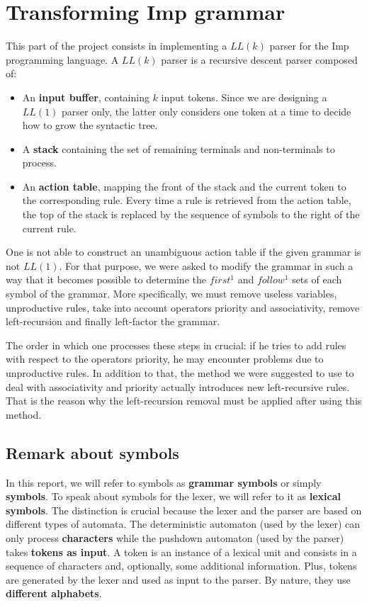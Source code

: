 \chapter{Transforming Imp grammar}

This part of the project consists in implementing a $LL(k)$ parser for the Imp programming language. A $LL(k)$ parser is a recursive descent parser composed of:

\begin{itemize}
\item An \textbf{input buffer}, containing $k$ input tokens. Since we are designing a $LL(1)$ parser only, the latter only considers one token at a time to decide how to grow the syntactic tree.
\item A \textbf{stack} containing the set of remaining terminals and non-terminals to process.
\item An \textbf{action table}, mapping the front of the stack and the current token to the corresponding rule. Every time a rule is retrieved from the action table, the top of the stack is replaced by the sequence of symbols to the right of the current rule.
\end{itemize}

One is not able to construct an unambiguous action table if the given grammar is not $LL(1)$. For that purpose, we were asked to modify the grammar in such a way
that it becomes possible to determine the $first^1$ and $follow^1$ sets of each symbol of the grammar. More specifically,
we must remove useless variables, unproductive rules, take into account operators priority and associativity, remove left-recursion and finally left-factor the grammar.

The order in which one processes these steps in crucial: if he tries to add rules with respect to the operators
priority, he may encounter problems due to unproductive rules. In addition to that, the method we were suggested to use
to deal with associativity and priority actually introduces new left-recursive rules. That is the reason why the
left-recursion removal must be applied after using this method.

\section{Remark about symbols}
In this report, we will refer to symbols as \textbf{grammar symbols} or simply \textbf{symbols}.
To speak about symbols for the lexer, we will refer to it as \textbf{lexical symbols}.
The distinction is crucial because the lexer and the parser are based on different types of automata.
The deterministic automaton (used by the lexer) can only process \textbf{characters} while the pushdown automaton (used by the parser) takes \textbf{tokens as input}.
A token is an instance of a lexical unit and consists in a sequence of characters and, optionally, some additional information.
Plus, tokens are generated by the lexer and used as input to the parser.
By nature, they use \textbf{different alphabets}.

